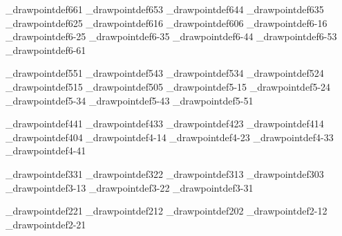 \def\brl@pgf_drawpointdef_loop{%
  \expandafter\brl@def_appendtoks\brl@tmp%
  \ifnum\brl@pgf_drawpointdef@width>\count@%
    \brl@def_appendtoks{\advance\brl@pgf@dx\@ne}%
    \advance\count@\@ne%
    \expandafter\brl@pgf_drawpointdef_loop%
  \fi%
}




\brl@pgf_drawpointdef{6}{6}{1}
\brl@pgf_drawpointdef{6}{5}{3}
\brl@pgf_drawpointdef{6}{4}{4}
\brl@pgf_drawpointdef{6}{3}{5}
\brl@pgf_drawpointdef{6}{2}{5}
\brl@pgf_drawpointdef{6}{1}{6}
\brl@pgf_drawpointdef{6}{0}{6}
\brl@pgf_drawpointdef{6}{-1}{6}
\brl@pgf_drawpointdef{6}{-2}{5}
\brl@pgf_drawpointdef{6}{-3}{5}
\brl@pgf_drawpointdef{6}{-4}{4}
\brl@pgf_drawpointdef{6}{-5}{3}
\brl@pgf_drawpointdef{6}{-6}{1}


\brl@pgf_drawpointdef{5}{5}{1}
\brl@pgf_drawpointdef{5}{4}{3}
\brl@pgf_drawpointdef{5}{3}{4}
\brl@pgf_drawpointdef{5}{2}{4}
\brl@pgf_drawpointdef{5}{1}{5}
\brl@pgf_drawpointdef{5}{0}{5}
\brl@pgf_drawpointdef{5}{-1}{5}
\brl@pgf_drawpointdef{5}{-2}{4}
\brl@pgf_drawpointdef{5}{-3}{4}
\brl@pgf_drawpointdef{5}{-4}{3}
\brl@pgf_drawpointdef{5}{-5}{1}


\brl@pgf_drawpointdef{4}{4}{1}
\brl@pgf_drawpointdef{4}{3}{3}
\brl@pgf_drawpointdef{4}{2}{3}
\brl@pgf_drawpointdef{4}{1}{4}
\brl@pgf_drawpointdef{4}{0}{4}
\brl@pgf_drawpointdef{4}{-1}{4}
\brl@pgf_drawpointdef{4}{-2}{3}
\brl@pgf_drawpointdef{4}{-3}{3}
\brl@pgf_drawpointdef{4}{-4}{1}


\brl@pgf_drawpointdef{3}{3}{1}
\brl@pgf_drawpointdef{3}{2}{2}
\brl@pgf_drawpointdef{3}{1}{3}
\brl@pgf_drawpointdef{3}{0}{3}
\brl@pgf_drawpointdef{3}{-1}{3}
\brl@pgf_drawpointdef{3}{-2}{2}
\brl@pgf_drawpointdef{3}{-3}{1}


\brl@pgf_drawpointdef{2}{2}{1}
\brl@pgf_drawpointdef{2}{1}{2}
\brl@pgf_drawpointdef{2}{0}{2}
\brl@pgf_drawpointdef{2}{-1}{2}
\brl@pgf_drawpointdef{2}{-2}{1}


